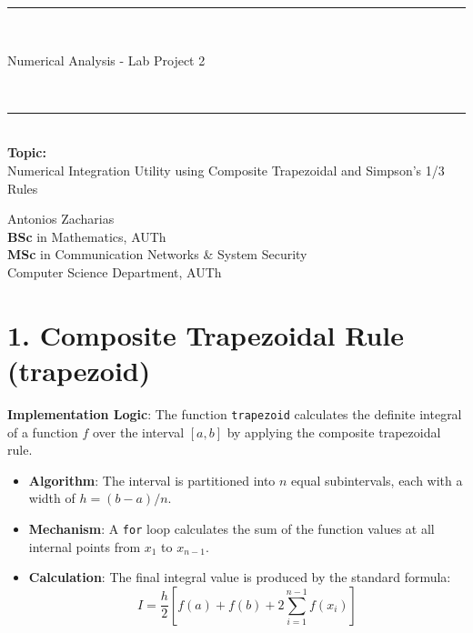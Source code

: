 \documentclass[12pt, a4paper]{article}
\newcommand{\HRule}{\rule{\linewidth}{0.5mm}}
\begin{document}
	
\begin{titlepage}
	\begin{center}
		\HRule \\[0.6cm] 
		{\huge \bfseries \strut Numerical Analysis - Lab Project 2} \\[0.4cm] 
		\HRule \\[1.5cm]
		{\large \textbf{Topic:}} \\
		{\large Numerical Integration Utility using Composite Trapezoidal and Simpson's 1/3 Rules} \\[2cm]
		
		\vfill 
		\begin{doublespacing}
			{\huge Antonios Zacharias\\}
			{\large \textbf{BSc} in Mathematics, AUTh\\}
			{\large \textbf{MSc} in Communication Networks \& System Security \\
			Computer Science Department, AUTh}
		\end{doublespacing}
	
		\vspace*{1cm} 
		\end{center}
\end{titlepage}	
	

		
\section*{1. Composite Trapezoidal Rule (trapezoid)}
\textbf{Implementation Logic}: The function \texttt{trapezoid} calculates the definite integral of a function $f$ over the interval $[a, b]$ by applying the composite trapezoidal rule.

\begin{itemize}
	\item \textbf{Algorithm}: The interval is partitioned into $n$ equal subintervals, each with a width of $h = (b-a)/n$.
	\item \textbf{Mechanism}: A \texttt{for} loop calculates the sum of the function values at all internal points from $x_1$ to $x_{n-1}$.
	\item \textbf{Calculation}: The final integral value is produced by the standard formula:
	\begin{equation*}
		I = \frac{h}{2} \left[ f(a) + f(b) + 2 \sum_{i=1}^{n-1} f(x_i) \right]
	\end{equation*}
\end{itemize}
\end{document}
